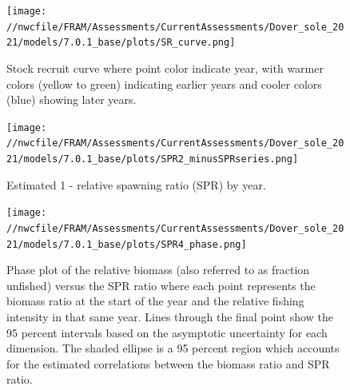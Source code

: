 \documentclass[11pt,
  english,
  a4paper,
]{article}
\begin{document}
\tagmcend\tagstructend


\begin{figure}
\centering
\texttt{[image: //nwcfile/FRAM/Assessments/CurrentAssessments/Dover\_sole\_2021/models/7.0.1\_base/plots/SR\_curve.png]}
\caption{Stock recruit curve where point color indicate year, with warmer colors (yellow to green) indicating earlier years and cooler colors (blue) showing later years.\label{fig:sr-curve}}
\end{figure}

\tagmcend\tagstructend


\begin{figure}
\centering
\texttt{[image: //nwcfile/FRAM/Assessments/CurrentAssessments/Dover\_sole\_2021/models/7.0.1\_base/plots/SPR2\_minusSPRseries.png]}
\caption{Estimated 1 - relative spawning ratio (SPR) by year.\label{fig:1-spr}}
\end{figure}

\tagmcend\tagstructend


\begin{figure}
\centering
\texttt{[image: //nwcfile/FRAM/Assessments/CurrentAssessments/Dover\_sole\_2021/models/7.0.1\_base/plots/SPR4\_phase.png]}
\caption{Phase plot of the relative biomass (also referred to as fraction unfished) versus the SPR ratio where each point represents the biomass ratio at the start of the year and the relative fishing intensity in that same year. Lines through the final point show the 95 percent intervals based on the asymptotic uncertainty for each dimension. The shaded ellipse is a 95 percent region which accounts for the estimated correlations between the biomass ratio and SPR ratio.\label{fig:phase}}
\end{figure}
\end{document}
